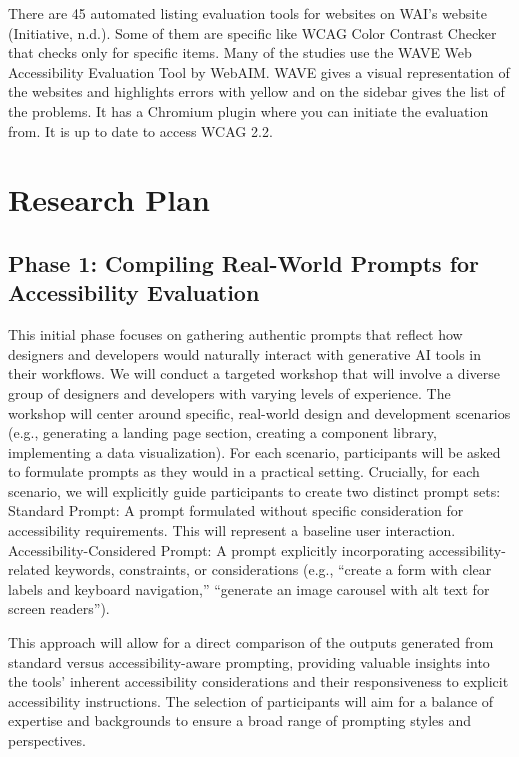 \documentclass{article}
\begin{document}
There are 45 automated listing  evaluation tools for websites on WAI’s website (Initiative, n.d.).
Some of them are specific like WCAG Color Contrast Checker that checks only for specific items.
Many of the studies use the WAVE Web Accessibility Evaluation Tool by WebAIM.
WAVE gives a visual representation of the websites and highlights errors with yellow and on the sidebar gives the list of the problems.
It has a Chromium plugin where you can initiate the evaluation from.  It is up to date to access WCAG 2.2. \cite{wave}

\section{Research Plan}

\subsection{Phase 1: Compiling Real-World Prompts for Accessibility Evaluation}

This initial phase focuses on gathering authentic prompts
that reflect how designers and developers would naturally interact with generative AI tools in their workflows.
We will conduct a targeted workshop that will involve a diverse group of designers and developers with varying levels of experience.
The workshop will center around specific, real-world design and development scenarios
(e.g., generating a landing page section, creating a component library, implementing a data visualization).
For each scenario, participants will be asked to formulate prompts as they would in a practical setting.
Crucially, for each scenario, we will explicitly guide participants to create two distinct prompt sets:
Standard Prompt: A prompt formulated without specific consideration for accessibility requirements. This will represent a baseline user interaction.
Accessibility-Considered Prompt: A prompt explicitly incorporating accessibility-related keywords, constraints, or considerations
(e.g., ``create a form with clear labels and keyboard navigation,'' ``generate an image carousel with alt text for screen readers'').

This approach will allow for a direct comparison of the outputs generated from standard versus accessibility-aware prompting,
providing valuable insights into the tools' inherent accessibility considerations and their responsiveness to explicit accessibility instructions.
The selection of participants will aim for a balance of expertise and backgrounds to ensure a broad range of prompting styles and perspectives.
\end{document}
